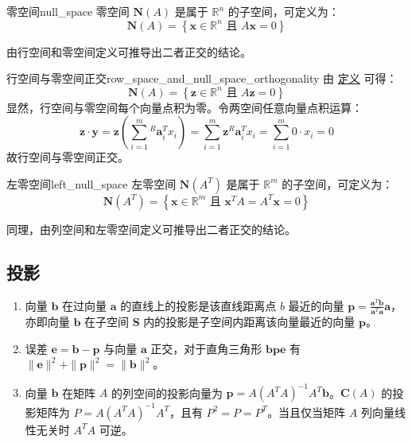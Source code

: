 \documentclass[cn,11pt,chinese,blue,bibstyle=ieeetr]{elegantbook}
\begin{document}
{\begin{definition}{零空间}{null_space}
零空间 $\bm{N}\left(A\right)$ 是属于 $\mathbb{R}^n$ 的子空间，可定义为：
\begin{equation}
\bm{N}\left(A\right) = \left\lbrace \bm{x} \in \mathbb{R}^n \text{ 且 } A\bm{x} = 0 \right\rbrace
\end{equation}
\end{definition}

由行空间和零空间定义可推导出二者正交的结论。

\begin{corollary}{行空间与零空间正交}{row_space_and_null_space_orthogonality}
由 \hyperref[def:null_space]{定义} 可得：
\begin{equation}
\bm{N}\left(A\right) = \left\lbrace \bm{z} \in \mathbb{R}^n \text{ 且 } A\bm{z} = 0 \right\rbrace
\end{equation}
显然，行空间与零空间每个向量点积为零。令两空间任意向量点积运算：
\begin{equation}
\bm{z} \cdot \bm{y} = \bm{z}\left(\sum_{i=1}^{m}{^R\bm{a}_i^T}x_i\right) = \sum_{i=1}^{m}\bm{z}{^R\bm{a}_i^T}x_i = \sum_{i=1}^{m}0 \cdot x_i = 0 \nonumber
\end{equation}
故行空间与零空间正交。
\end{corollary}

\begin{definition}{左零空间}{left_null_space}
左零空间 $\bm{N}\left(A^T\right)$ 是属于 $\mathbb{R}^m$ 的子空间，可定义为：
\begin{equation}
\bm{N}\left(A^T\right) = \left\lbrace \bm{x} \in \mathbb{R}^m \text{ 且 } \bm{x}^TA = A^T\bm{x} = 0 \right\rbrace
\end{equation}
\end{definition}

同理，由列空间和左零空间定义可推导出二者正交的结论。


\subsection{投影}

\begin{enumerate}
\item 向量 $\bm{b}$ 在过向量 $\bm{a}$ 的直线上的投影是该直线距离点 $b$ 最近的向量 $\bm{p} = \frac{\bm{a}^T\bm{b}}{\bm{a}^T\bm{a}}\bm{a}$，亦即向量 $\bm{b}$ 在子空间 $\bm{S}$ 内的投影是子空间内距离该向量最近的向量 $\bm{p}$。
\item 误差 $\bm{e} = \bm{b} - \bm{p}$ 与向量 $\bm{a}$ 正交，对于直角三角形 $\bm{bpe}$ 有 $\|\bm{e}\|^2 + \|\bm{p}\|^2 = \|\bm{b}\|^2$。
\item 向量 $\bm{b}$ 在矩阵 $A$ 的列空间的投影向量为 $\bm{p} = A\left(A^TA\right)^{-1}A^T\bm{b}$。$\bm{C}\left(A\right)$ 的投影矩阵为 $P = A\left(A^TA\right)^{-1}A^T$，且有 $P^2=P=P^T$。当且仅当矩阵 $A$ 列向量线性无关时 $A^TA$ 可逆。
\end{enumerate}


}
\end{document}
